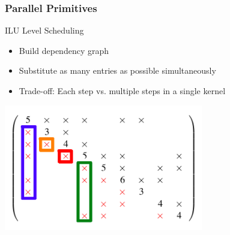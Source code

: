 \begin{frame}[fragile]
\frametitle{Parallel Primitives}

     \begin{block}{ILU Level Scheduling}
      \begin{itemize}
        \item Build dependency graph
        \item Substitute as many entries as possible simultaneously
        \item Trade-off: Each step vs. multiple steps in a single kernel
      \end{itemize}

      \begin{center}
       \includegraphics[width=0.65\textwidth]{figures/level-scheduling-3.png}
      \end{center}

    \end{block}
\end{frame}


